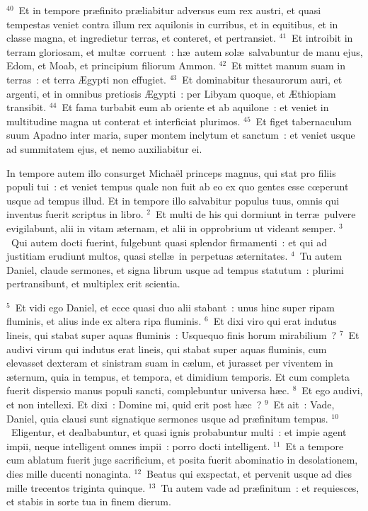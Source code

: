 ${}^{40}$~Et in tempore pr\ae finito pr\ae liabitur adversus eum rex austri, et quasi tempestas veniet contra illum rex aquilonis in curribus, et in equitibus, et in classe magna, et ingredietur terras, et conteret, et pertransiet.
${}^{41}$~Et introibit in terram gloriosam, et mult\ae\ corruent~: h\ae\ autem sol\ae\ salvabuntur de manu ejus, Edom, et Moab, et principium filiorum Ammon.
${}^{42}$~Et mittet manum suam in terras~: et terra \AE gypti non effugiet.
${}^{43}$~Et dominabitur thesaurorum auri, et argenti, et in omnibus pretiosis \AE gypti~: per Libyam quoque, et \AE thiopiam transibit.
${}^{44}$~Et fama turbabit eum ab oriente et ab aquilone~: et veniet in multitudine magna ut conterat et interficiat plurimos.
${}^{45}$~Et figet tabernaculum suum Apadno inter maria, super montem inclytum et sanctum~: et veniet usque ad summitatem ejus, et nemo auxiliabitur ei.

\bchapter
\lettrine[lines=3,image=true,loversize=0.05,lraise=-0.03]{I}{}n tempore autem illo consurget Micha\"el princeps magnus, qui stat pro filiis populi tui~: et veniet tempus quale non fuit ab eo ex quo gentes esse cœperunt usque ad tempus illud. Et in tempore illo salvabitur populus tuus, omnis qui inventus fuerit scriptus in libro.
${}^{2}$~Et multi de his qui dormiunt in terr\ae\ pulvere evigilabunt, alii in vitam \ae ternam, et alii in opprobrium ut videant semper.
${}^{3}$~Qui autem docti fuerint, fulgebunt quasi splendor firmamenti~: et qui ad justitiam erudiunt multos, quasi stell\ae\ in perpetuas \ae ternitates.
${}^{4}$~Tu autem Daniel, claude sermones, et signa librum usque ad tempus statutum~: plurimi pertransibunt, et multiplex erit scientia.


${}^{5}$~Et vidi ego Daniel, et ecce quasi duo alii stabant~: unus hinc super ripam fluminis, et alius inde ex altera ripa fluminis.
${}^{6}$~Et dixi viro qui erat indutus lineis, qui stabat super aquas fluminis~: Usquequo finis horum mirabilium~?
${}^{7}$~Et audivi virum qui indutus erat lineis, qui stabat super aquas fluminis, cum elevasset dexteram et sinistram suam in c\ae lum, et jurasset per viventem in \ae ternum, quia in tempus, et tempora, et dimidium temporis. Et cum completa fuerit dispersio manus populi sancti, complebuntur universa h\ae c.
${}^{8}$~Et ego audivi, et non intellexi. Et dixi~: Domine mi, quid erit post h\ae c~?
${}^{9}$~Et ait~: Vade, Daniel, quia clausi sunt signatique sermones usque ad pr\ae finitum tempus.
${}^{10}$~Eligentur, et dealbabuntur, et quasi ignis probabuntur multi~: et impie agent impii, neque intelligent omnes impii~: porro docti intelligent.
${}^{11}$~Et a tempore cum ablatum fuerit juge sacrificium, et posita fuerit abominatio in desolationem, dies mille ducenti nonaginta.
${}^{12}$~Beatus qui exspectat, et pervenit usque ad dies mille trecentos triginta quinque.
${}^{13}$~Tu autem vade ad pr\ae finitum~: et requiesces, et stabis in sorte tua in finem dierum.

